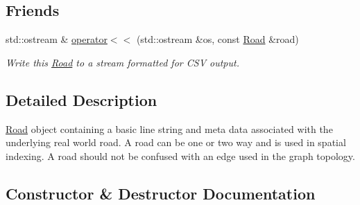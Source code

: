 \subsection*{Friends}
\begin{DoxyCompactItemize}
\item 
std\+::ostream \& \hyperlink{classgeo_1_1Road_a9f00f89b48840bb6e500adbb1e4b1ab7}{operator$<$$<$} (std\+::ostream \&os, const \hyperlink{classgeo_1_1Road}{Road} \&road)
\begin{DoxyCompactList}\small\item\em Write this \hyperlink{classgeo_1_1Road}{Road} to a stream formatted for C\+SV output. \end{DoxyCompactList}\end{DoxyCompactItemize}


\subsection{Detailed Description}
\hyperlink{classgeo_1_1Road}{Road} object containing a basic line string and meta data associated with the underlying real world road. A road can be one or two way and is used in spatial indexing. A road should not be confused with an edge used in the graph topology. 

\subsection{Constructor \& Destructor Documentation}
